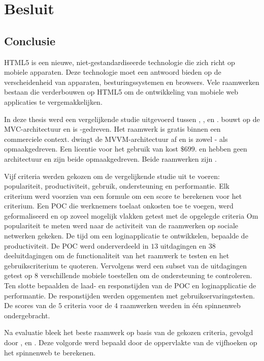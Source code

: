 \chapter{Besluit}
\label{chap:besluit}

\section{Conclusie} %
HTML5 is een nieuwe,  niet-gestandardiseerde technologie die zich richt op mobiele apparaten.
Deze technologie moet een antwoord bieden op de verscheidenheid van apparaten,  besturingssystemen en browsers.
Vele raamwerken bestaan die verderbouwen op HTML5 om de ontwikkeling van mobiele web applicaties te vergemakkelijken.

In deze thesis werd een vergelijkende studie uitgevoerd tussen \st{}, \kendo{},  \jqm{} en \lungo{}.
\st{} bouwt op de MVC-architectuur en is \js-gedreven.
Het raamwerk is gratis binnen een commerciele context.
\kendo{} dwingt de MVVM-architectuur af en is zowel \js- als opmaakgedreven.
Een licentie voor het gebruik van \kendo{} kost $\$699$.
\jqm{} en \lungo{} hebben geen architectuur en zijn beide opmaakgedreven.
Beide raamwerken zijn .

Vijf criteria werden gekozen om de vergelijkende studie uit te voeren:  populariteit,  productiviteit,  gebruik,  ondersteuning en performantie.
Elk criterium werd voorzien van een formule om een score te berekenen voor het criterium.
Een POC die werknemers toelaat onkosten toe te voegen, werd geformaliseerd en op zoveel mogelijk vlakken getest met de opgelegde criteria
Om populariteit te meten werd naar de activiteit van de raamwerken op sociale netwerken gekeken.
De tijd om een loginapplicatie te ontwikkelen, bepaalde de productiviteit.
De POC werd onderverdeeld in $13$ uitdagingen en $38$ deeluitdagingen om de functionaliteit van het raamwerk te testen en het gebruikscriterium te quoteren.
Vervolgens werd een subset van de uitdagingen getest op $8$ verschillende mobiele toestellen om de ondersteuning te controleren.
Ten slotte bepaalden de laad- en responstijden van de POC en loginapplicatie de performantie.
De responstijden werden opgementen met gebruikservaringstesten.
De scores van de $5$ criteria voor de $4$ raamwerken werden in één spinnenweb ondergebracht.

Na evaluatie bleek \jqm{} het beste raamwerk op basis van de gekozen criteria, gevolgd door \kendo{}, \lungo{} en \st{}.
Deze volgorde werd bepaald door de oppervlakte van de vijfhoeken op het spinnenweb te berekenen.


